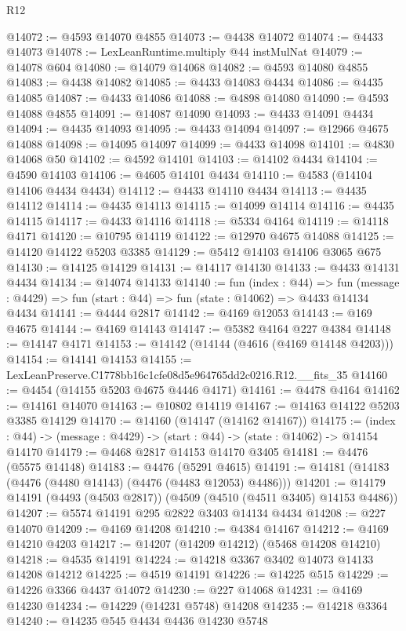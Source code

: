 \begin{lexlean}{R12}
\begin{coremodule}
@14072 := @4593 @14070 @4855
@14073 := @4438 @14072
@14074 := @4433 @14073
@14078 := LexLeanRuntime.multiply @44 instMulNat
@14079 := @14078 @604
@14080 := @14079 @14068
@14082 := @4593 @14080 @4855
@14083 := @4438 @14082
@14085 := @4433 @14083 @4434
@14086 := @4435 @14085
@14087 := @4433 @14086
@14088 := @4898 @14080
@14090 := @4593 @14088 @4855
@14091 := @14087 @14090
@14093 := @4433 @14091 @4434
@14094 := @4435 @14093
@14095 := @4433 @14094
@14097 := @12966 @4675 @14088
@14098 := @14095 @14097
@14099 := @4433 @14098
@14101 := @4830 @14068 @50
@14102 := @4592 @14101
@14103 := @14102 @4434
@14104 := @4590 @14103
@14106 := @4605 @14101 @4434
@14110 := @4583 (@14104 @14106 @4434 @4434)
@14112 := @4433 @14110 @4434
@14113 := @4435 @14112
@14114 := @4435 @14113
@14115 := @14099 @14114
@14116 := @4435 @14115
@14117 := @4433 @14116
@14118 := @5334 @4164
@14119 := @14118 @4171
@14120 := @10795 @14119
@14122 := @12970 @4675 @14088
@14125 := @14120 @14122 @5203 @3385
@14129 := @5412 @14103 @14106 @3065 @675
@14130 := @14125 @14129
@14131 := @14117 @14130
@14133 := @4433 @14131 @4434
@14134 := @14074 @14133
@14140 := fun (index : @44) =>
  fun (message : @4429) => fun (start : @44) => fun (state : @14062) => @4433 @14134 @4434
@14141 := @4444 @2817
@14142 := @4169 @12053
@14143 := @169 @4675
@14144 := @4169 @14143
@14147 := @5382 @4164 @227 @4384
@14148 := @14147 @4171
@14153 := @14142 (@14144 (@4616 (@4169 @14148 @4203)))
@14154 := @14141 @14153
@14155 := LexLeanPreserve.C1778bb16c1cfe08d5e964765dd2c0216.R12.__fits_35
@14160 := @4454 (@14155 @5203 @4675 @4446 @4171)
@14161 := @4478 @4164
@14162 := @14161 @14070
@14163 := @10802 @14119
@14167 := @14163 @14122 @5203 @3385 @14129
@14170 := @14160 (@14147 (@14162 @14167))
@14175 := (index : @44) -> (message : @4429) -> (start : @44) -> (state : @14062) -> @14154 @14170
@14179 := @4468 @2817 @14153 @14170 @3405
@14181 := @4476 (@5575 @14148)
@14183 := @4476 (@5291 @4615)
@14191 := @14181 (@14183 (@4476 (@4480 @14143) (@4476 (@4483 @12053) @4486)))
@14201 := @14179 @14191 (@4493 (@4503 @2817)) (@4509 (@4510 (@4511 @3405) @14153 @4486))
@14207 := @5574 @14191 @295 @2822 @3403 @14134 @4434
@14208 := @227 @14070
@14209 := @4169 @14208
@14210 := @4384 @14167
@14212 := @4169 @14210 @4203
@14217 := @14207 (@14209 @14212) (@5468 @14208 @14210)
@14218 := @4535 @14191
@14224 := @14218 @3367 @3402 @14073 @14133 @14208 @14212
@14225 := @4519 @14191
@14226 := @14225 @515
@14229 := @14226 @3366 @4437 @14072
@14230 := @227 @14068
@14231 := @4169 @14230
@14234 := @14229 (@14231 @5748) @14208
@14235 := @14218 @3364
@14240 := @14235 @545 @4434 @4436 @14230 @5748

\end{coremodule}
\end{lexlean}
